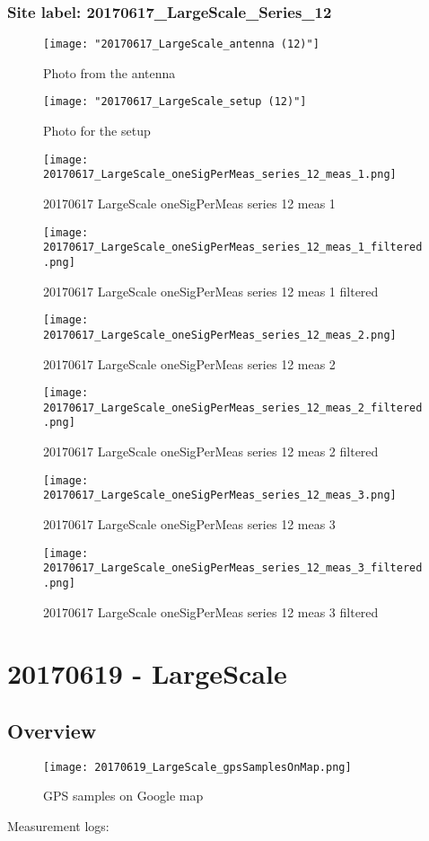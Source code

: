 \subsubsection{Site label: 20170617\_LargeScale\_Series\_12}
\begin{figure}[ht] \caption{Photo from the antenna}
\texttt{[image: "20170617\_LargeScale\_antenna (12)"]}\centering\end{figure}
\begin{figure}[ht] \caption{Photo for the setup}
\texttt{[image: "20170617\_LargeScale\_setup (12)"]}\centering\end{figure}
\begin{figure}[ht] \caption{20170617 LargeScale oneSigPerMeas series 12 meas 1}
\texttt{[image: 20170617\_LargeScale\_oneSigPerMeas\_series\_12\_meas\_1.png]}\centering\end{figure}
\begin{figure}[ht] \caption{20170617 LargeScale oneSigPerMeas series 12 meas 1 filtered}
\texttt{[image: 20170617\_LargeScale\_oneSigPerMeas\_series\_12\_meas\_1\_filtered.png]}\centering\end{figure}
\begin{figure}[ht] \caption{20170617 LargeScale oneSigPerMeas series 12 meas 2}
\texttt{[image: 20170617\_LargeScale\_oneSigPerMeas\_series\_12\_meas\_2.png]}\centering\end{figure}
\begin{figure}[ht] \caption{20170617 LargeScale oneSigPerMeas series 12 meas 2 filtered}
\texttt{[image: 20170617\_LargeScale\_oneSigPerMeas\_series\_12\_meas\_2\_filtered.png]}\centering\end{figure}
\begin{figure}[ht] \caption{20170617 LargeScale oneSigPerMeas series 12 meas 3}
\texttt{[image: 20170617\_LargeScale\_oneSigPerMeas\_series\_12\_meas\_3.png]}\centering\end{figure}
\begin{figure}[ht] \caption{20170617 LargeScale oneSigPerMeas series 12 meas 3 filtered}
\texttt{[image: 20170617\_LargeScale\_oneSigPerMeas\_series\_12\_meas\_3\_filtered.png]}\centering\end{figure}
\clearpage
\section{20170619 - LargeScale}
\subsection{Overview}
\begin{figure}[ht] \caption{GPS samples on Google map}
\texttt{[image: 20170619\_LargeScale\_gpsSamplesOnMap.png]}\centering\end{figure}
\begin{minipage}{\textwidth} Measurement logs:

 \end{minipage}
\clearpage
